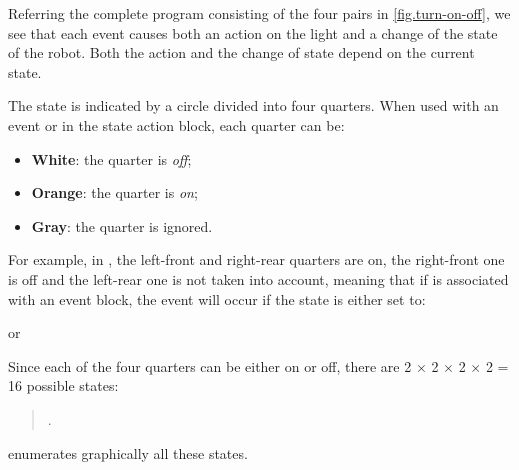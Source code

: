 Referring the complete program consisting of the four pairs in \cref{fig.turn-on-off}, we see that
each event causes both an action on the light and a change of the state
of the robot. Both the action and the change of state depend on the
current state.

\newpage


The state is indicated by a circle divided into four quarters.
When used with an event or in the state action block, each quarter can be:
\begin{itemize}
\item \textbf{White}: the quarter is \emph{off};
\item \textbf{Orange}: the quarter is \emph{on};
\item \textbf{Gray}: the quarter is ignored.
\end{itemize}

For example, in , the left-front and right-rear quarters are on, the
right-front one is off and the left-rear one is not taken into account,
meaning that if  is associated with an event block, the
event will occur if the state is either set to:
\begin{center}
\centering {}\quad or \quad {}
\end{center}

Since each of the four quarters can be either on or off, there are 2 $\times$ 2 $\times$ 2 $\times$ 2 = 16 possible states:
\begin{quote}
.
\end{quote}
 enumerates graphically all these states.




